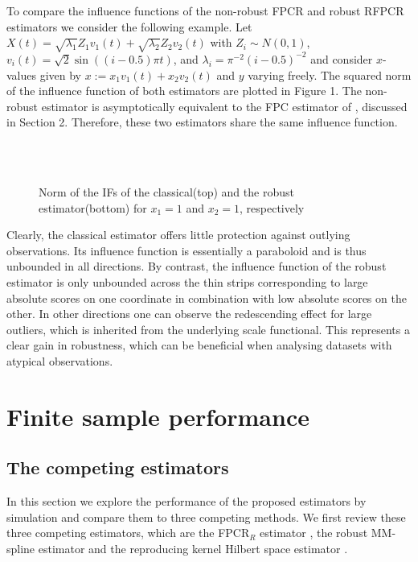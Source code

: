 \documentclass[11pt]{article}
\begin{document}
To compare the influence functions of the non-robust FPCR  and robust RFPCR estimators we consider the following example. Let $X(t) = \sqrt{\lambda_1} Z_1 v_1(t) + \sqrt{\lambda_2} Z_2 v_2(t)$ with $Z_i \sim N(0,1)$,  $v_i(t) = \sqrt{2} \sin \left( \left(i-0.5 \right) \pi t \right)$, and $\lambda_i = \pi^{-2} \left(i-0.5\right)^{-2}$ and consider $x$-values given by $ x := x_1 v_1(t) + x_2 v_2(t)$ and $y$ varying freely. The squared norm of the influence function of both estimators are plotted in Figure 1. The non-robust estimator is asymptotically equivalent to the FPC estimator of \cite{cardot1999functional}, discussed in Section 2. Therefore, these two estimators share the same influence function.
\begin{figure}[H]
\centering
{} \
\\
 \
\caption{Norm of the IFs of the classical(top) and the robust estimator(bottom) for $x_1 = 1$ and $x_2=1$, respectively}
\end{figure}
Clearly, the classical estimator offers little protection against outlying observations. Its influence function is essentially a paraboloid and is thus unbounded in all directions. By contrast, the influence function of the robust estimator is only unbounded across the thin strips corresponding to large absolute scores on one coordinate in combination with low absolute scores on the other. In other directions one can observe the redescending effect for large outliers, which is inherited from the underlying scale functional. This represents a clear gain in robustness, which can be beneficial when analysing datasets with atypical observations. 


\section{Finite sample performance}

\subsection{The competing estimators}

In this section we explore the performance of the proposed estimators by simulation and compare them to three competing methods. We first review these three competing estimators, which are the FPCR$_R$ estimator \citep{reiss2007functional}, the robust MM-spline estimator \citep{maronna2013robust} and the reproducing kernel Hilbert space estimator \citep{shin2016rkhs}.
\end{document}
